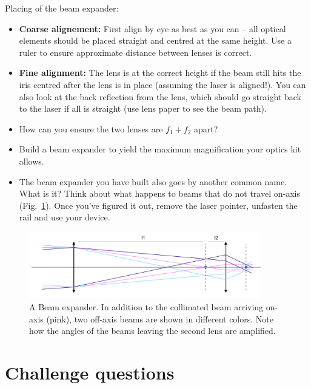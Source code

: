 \documentclass[a4paper]{report}
\begin{document}
	\noindent
	Placing of the beam expander:
	\begin{itemize}
	    \item \textbf{Coarse alignement:} First align by eye as best as you can -- all optical elements should be placed straight and centred at the same height. Use a ruler to ensure approximate distance between lenses is correct.
		\item \textbf{Fine alignment:} The lens is at the correct height if the beam still hits the iris centred after the lens is in place (assuming the laser is aligned!). You can also look at the back reflection from the lens, which should go straight back to the laser if all is straight (use lens paper to see the beam path).
		\item How can you ensure the two lenses are $f_1+f_2$ apart?
        \item Build a beam expander to yield the maximum magnification your optics kit allows.
		\item The beam expander you have built also goes by another common name.  What is it? 
		Think about what happens to beams that do not travel on-axis (Fig.~\ref{fig:telescope}). Once you've figured it out, remove the laser pointer, unfasten the rail and use your device.
	\end{itemize}


	
	\begin{figure}[h]
		\center
		\includegraphics[width=0.9\textwidth]{figures/telescope.png}
		\captionsetup{width=0.9\textwidth}
		\caption{A Beam expander. In addition to the collimated beam arriving on-axis (pink), two off-axis beams are shown in different colors. Note how the angles of the beams leaving the second lens are amplified.}
		\label{fig:telescope}
	\end{figure}
	
	\clearpage
	\section{Challenge questions}
	
\end{document}
